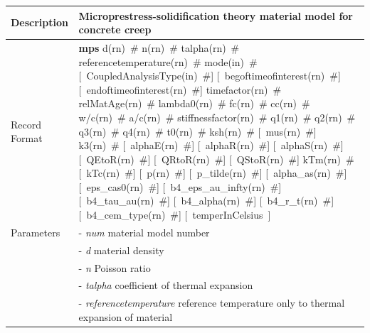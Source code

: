 \documentclass[a4paper]{article}
\newcommand{\descitem}[1]{{\noindent \bf #1}}
\newcommand{\elemparam}[2]{{{#1\tiny (#2)}~\#}}
\newcommand{\optelemparam}[2]{[{~\elemparam{#1}{#2}}]}
\newcommand{\elemstring}[1]{{#1}}
\newcommand{\optelemstring}[1]{[{~\elemstring{#1}~}]}
\newcommand{\param}[1]{{\it #1}}
\newenvironment{mmt}{\begin{tabular}{|l|p{9cm}|}}{\end{tabular}\\}
\newenvironment{mmt}{\begin{tabular}{|l|l|}}{\end{tabular}\\}
\begin{document}
\begin{table}[!htb]
\begin{mmt}
\hline
Description & Microprestress-solidification theory material model for concrete creep\\
\hline
Record Format & \descitem{mps} 
\elemparam{d}{rn} \elemparam{n}{rn} \elemparam{talpha}{rn} \elemparam{referencetemperature}{rn}
%
\elemparam{mode}{in} 
\optelemparam{CoupledAnalysisType}{in}
\optelemparam{begoftimeofinterest}{rn} \optelemparam{endoftimeofinterest}{rn} \elemparam{timefactor}{rn} \elemparam{relMatAge}{rn} \elemparam{lambda0}{rn}
\elemparam{fc}{rn} \elemparam{cc}{rn} \elemparam{w/c}{rn} \elemparam{a/c}{rn} \elemparam{stiffnessfactor}{rn} 
\elemparam{q1}{rn} \elemparam{q2}{rn} \elemparam{q3}{rn} \elemparam{q4}{rn}
%
%
\elemparam{t0}{rn} \elemparam{ksh}{rn} 
\optelemparam{mus}{rn} \elemparam{k3}{rn} 
%
\optelemparam{alphaE}{rn} \optelemparam{alphaR}{rn} \optelemparam{alphaS}{rn}
\optelemparam{QEtoR}{rn} \optelemparam{QRtoR}{rn} \optelemparam{QStoR}{rn}
%
\elemparam{kTm}{rn}  \optelemparam{kTc}{rn} 
%
\optelemparam{p}{rn} \optelemparam{p\_tilde}{rn}  
%
\optelemparam{alpha\_as}{rn} \optelemparam{eps\_cas0}{rn}
\optelemparam{b4\_eps\_au\_infty}{rn} \optelemparam{b4\_tau\_au}{rn} \optelemparam{b4\_alpha}{rn} \optelemparam{b4\_r\_t}{rn} \optelemparam{b4\_cem\_type}{rn} 
%
\optelemstring{temperInCelsius}
%             
\\Parameters 
&- \param{num} material model number\\
&- \param{d} material density\\
&- \param{n} Poisson ratio\\
&- \param{talpha} coefficient of thermal expansion\\
&- \param{referencetemperature} reference temperature only to thermal expansion of material\\


\end{mmt}
\end{table}
\end{document}
